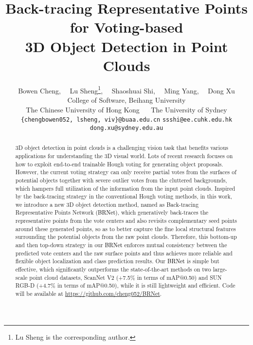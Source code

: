 \documentclass[final]{cvpr}
\newcommand{\method}{\textcolor{black}{BRNet }}
\newcommand{\methodnospace}{\textcolor{black}{BRNet}}
\begin{document}
\title{
Back-tracing Representative Points for Voting-based \\
3D Object Detection in Point Clouds
}

\author{
    Bowen Cheng,~~
    Lu Sheng\thanks{Lu Sheng is the corresponding author.},~~
    Shaoshuai Shi,~~
    Ming Yang,~~
    Dong Xu \\
    College of Software, Beihang University \\ The Chinese University of Hong Kong ~~ The University of Sydney \\
    \small
    \texttt{\{chengbowen052, lsheng, viv\}@buaa.edu.cn} \hspace{20pt}
    \texttt{ssshi@ee.cuhk.edu.hk} \hspace{20pt}
    \texttt{dong.xu@sydney.edu.au}
}

\maketitle



\begin{abstract}
3D object detection in point clouds is a challenging vision task that benefits various applications for understanding the 3D visual world.
Lots of recent research focuses on how to exploit end-to-end trainable Hough voting for generating object proposals.
However, the current voting strategy can only receive partial votes from the surfaces of potential objects together with severe outlier votes from the cluttered backgrounds, which hampers full utilization of the information from the input point clouds.
Inspired by the back-tracing strategy in the conventional Hough voting methods, in this work, we introduce a new 3D object detection method, named as Back-tracing Representative Points Network (\methodnospace), which generatively back-traces the representative points from the vote centers and also revisits complementary seed points around these generated points, so as to better capture the fine local structural features surrounding the potential objects from the raw point clouds.
Therefore, this bottom-up and then top-down strategy in our \method enforces mutual consistency between the predicted vote centers and the raw surface points and thus achieves more reliable and flexible object localization and class prediction results.
Our \method is simple but effective, which significantly outperforms the state-of-the-art methods on two large-scale point cloud datasets, ScanNet V2 (+7.5\% in terms of mAP@0.50) and SUN RGB-D (+4.7\% in terms of mAP@0.50), while it is still lightweight and efficient.
Code will be available at \href{https://github.com/cheng052/BRNet}{https://github.com/cheng052/BRNet}.
\end{abstract}
\end{document}
